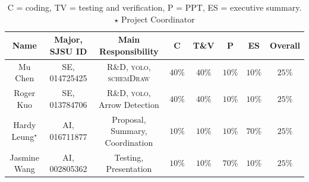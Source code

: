 \documentclass[10pt]{article}
\begin{document}


\begin{table}[htbp]
\centering
\begin{tabular}{|c|c|c|c|c|c|c|c|}
\hline
Name & Major, SJSU ID & Main Responsibility & \textsc{C} &
	\textsc{T\&V} & \textsc{P} & \textsc{ES} & Overall \\
\hline
Mu Chen & SE, 014725425 & R\&D, \textsc{yolo}, \textsc{schemDraw} & $40\%$ & $40\%$ & $10\%$ & $10\%$ & $25\%$ \\
Roger Kuo & SE, 013784706 & R\&D, \textsc{yolo}, Arrow Detection & $40\%$ & $40\%$ & $10\%$ & $10\%$ & $25\%$ \\
Hardy Leung${}^\star$ & AI, 016711877 &
Proposal, Summary, Coordination & $10\%$ & $10\%$ & $10\%$ & $70\%$ & $25\%$ \\
Jasmine Wang & AI, 002805362 & Testing, Presentation & $10\%$ & $10\%$ & $70\%$ & $10\%$ & $25\%$ \\ \hline
\end{tabular}
\caption{\textsc{C} = coding, \textsc{TV} =
testing and verification,
\textsc{P} = PPT, \textsc{ES} = executive summary. $\star$ Project Coordinator}
\end{table}

% 
% 
\end{document}

